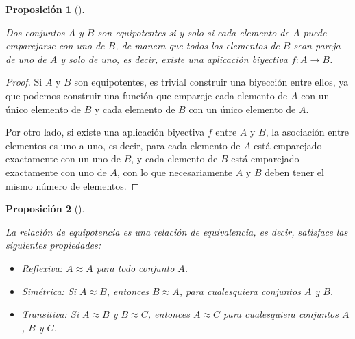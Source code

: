 \documentclass[
  a4paper,
]{scrreport}
\providecommand{\tightlist}{%
  \setlength{\itemsep}{0pt}\setlength{\parskip}{0pt}}\usepackage{longtable,booktabs,array}
\theoremstyle{plain}
\theoremstyle{plain}
\theoremstyle{definition}
\theoremstyle{definition}
\theoremstyle{plain}
\newtheorem{proposition}{Proposición}[chapter]
\theoremstyle{definition}
\theoremstyle{remark}
\begin{document}
\begin{proposition}[]\protect\hypertarget{prp-biyeccion-conjuntos-equipotentes}{}\label{prp-biyeccion-conjuntos-equipotentes}

Dos conjuntos \(A\) y \(B\) son equipotentes si y solo si cada elemento
de \(A\) puede emparejarse con uno de \(B\), de manera que todos los
elementos de \(B\) sean pareja de uno de \(A\) y solo de uno, es decir,
existe una aplicación biyectiva \(f:A\rightarrow B\).

\end{proposition}

\begin{tcolorbox}[enhanced jigsaw, rightrule=.15mm, toptitle=1mm, colbacktitle=quarto-callout-note-color!10!white, bottomrule=.15mm, opacityback=0, arc=.35mm, breakable, toprule=.15mm, left=2mm, coltitle=black, colback=white, opacitybacktitle=0.6, titlerule=0mm, colframe=quarto-callout-note-color-frame, bottomtitle=1mm, title=\textcolor{quarto-callout-note-color}{\faInfo}\hspace{0.5em}{Demostración}, leftrule=.75mm]

\begin{proof}

Si \(A\) y \(B\) son equipotentes, es trivial construir una biyección
entre ellos, ya que podemos construir una función que empareje cada
elemento de \(A\) con un único elemento de \(B\) y cada elemento de
\(B\) con un único elemento de \(A\).

Por otro lado, si existe una aplicación biyectiva \(f\) entre \(A\) y
\(B\), la asociación entre elementos es uno a uno, es decir, para cada
elemento de \(A\) está emparejado exactamente con un uno de \(B\), y
cada elemento de \(B\) está emparejado exactamente con uno de \(A\), con
lo que necesariamente \(A\) y \(B\) deben tener el mismo número de
elementos.

\end{proof}

\end{tcolorbox}

\begin{proposition}[]\protect\hypertarget{prp-equipotencia-relacion-equivalencia}{}\label{prp-equipotencia-relacion-equivalencia}

La relación de equipotencia es una relación de equivalencia, es decir,
satisface las siguientes propiedades:

\begin{itemize}
\tightlist
\item
  \emph{Reflexiva:} \(A\approx A\) para todo conjunto \(A\).
\item
  \emph{Simétrica:} Si \(A\approx B\), entonces \(B\approx A\), para
  cualesquiera conjuntos \(A\) y \(B\).
\item
  \emph{Transitiva:} Si \(A\approx B\) y \(B\approx C\), entonces
  \(A\approx C\) para cualesquiera conjuntos \(A\), \(B\) y \(C\).
\end{itemize}

\end{proposition}
\end{document}
